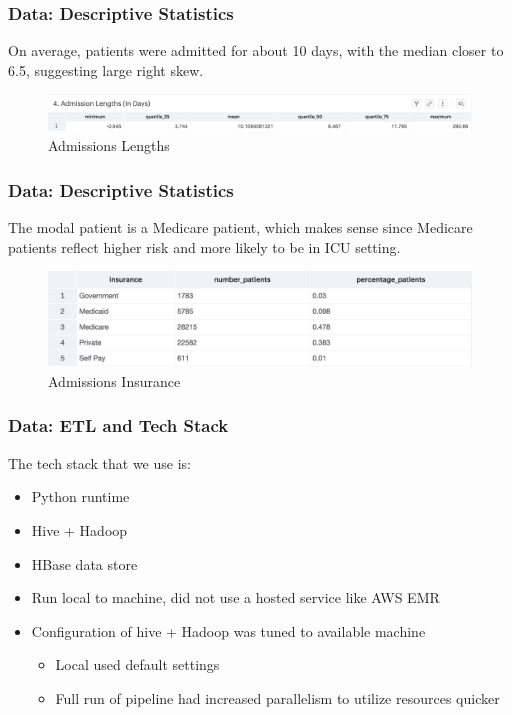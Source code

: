 \documentclass{beamer}
\begin{document}
\begin{frame}
\frametitle{Data: Descriptive Statistics}
On average, patients were admitted for about 10 days, with the median closer to 6.5, suggesting large right skew.

\begin{figure}[H]
\centering
\caption{Admissions Lengths}
\label{AdmissionsLengths}
\includegraphics[page = {1}, scale = 0.2]{./images/admissions-lengths.png}
\end{figure}
\end{frame}

\begin{frame}
\frametitle{Data: Descriptive Statistics}
The modal patient is a Medicare patient, which makes sense since Medicare patients reflect higher risk and more likely to be in ICU setting.

\begin{figure}[H]
\centering
\caption{Admissions Insurance}
\label{AdmissionsInsurance}
\includegraphics[page = {1}, scale = 0.4]{./images/admissions-insurance-summary.png}
\end{figure}
\end{frame}

\begin{frame}
\frametitle{Data: ETL and Tech Stack}
\label{ETL}
The tech stack that we use is:

\begin{itemize}
\item Python runtime
\item Hive + Hadoop
\item HBase data store
\item Run local to machine, did not use a hosted service like AWS EMR
\item Configuration of hive + Hadoop was tuned to available machine

  \begin{itemize}
    \item Local used default settings
    \item Full run of pipeline had increased parallelism to utilize resources quicker
  \end{itemize}
\end{itemize}
\end{frame}
\end{document}
